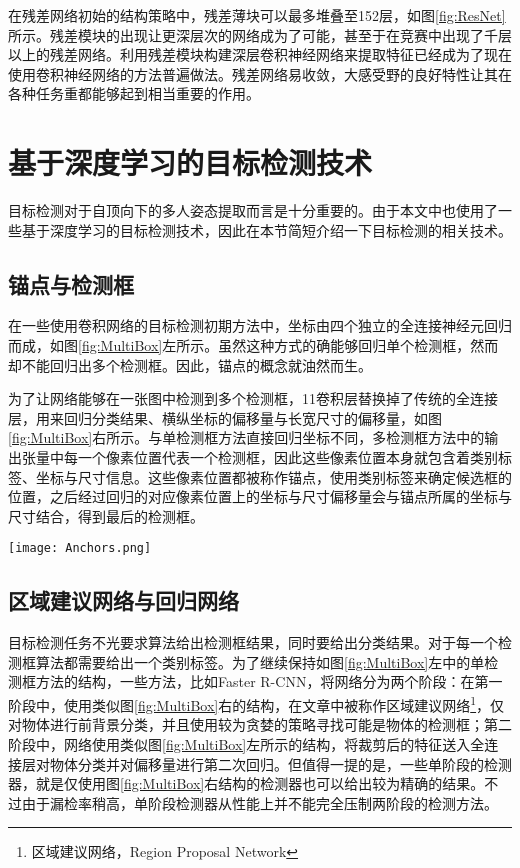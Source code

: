 在残差网络初始的结构策略中，残差薄块可以最多堆叠至152层，如图\ref{fig:ResNet}所示。残差模块的出现让更深层次的网络成为了可能，甚至于在竞赛中出现了千层以上的残差网络。利用残差模块构建深层卷积神经网络来提取特征已经成为了现在使用卷积神经网络的方法普遍做法。残差网络易收敛，大感受野的良好特性让其在各种任务重都能够起到相当重要的作用。

\section{基于深度学习的目标检测技术}
\label{sec:factsobjectdetection}
目标检测对于自顶向下的多人姿态提取而言是十分重要的。由于本文中也使用了一些基于深度学习的目标检测技术，因此在本节简短介绍一下目标检测的相关技术。

\subsection{锚点与检测框}
\label{subsec:factsanchors}
在一些使用卷积网络的目标检测初期方法中，坐标由四个独立的全连接神经元回归而成，如图\ref{fig:MultiBox}左所示。虽然这种方式的确能够回归单个检测框，然而却不能回归出多个检测框。因此，锚点的概念就油然而生。

为了让网络能够在一张图中检测到多个检测框，1\times1卷积层替换掉了传统的全连接层，用来回归分类结果、横纵坐标的偏移量与长宽尺寸的偏移量，如图\ref{fig:MultiBox}右所示。与单检测框方法直接回归坐标不同，多检测框方法中的输出张量中每一个像素位置代表一个检测框，因此这些像素位置本身就包含着类别标签、坐标与尺寸信息。这些像素位置都被称作锚点，使用类别标签来确定候选框的位置，之后经过回归的对应像素位置上的坐标与尺寸偏移量会与锚点所属的坐标与尺寸结合，得到最后的检测框。

\begin{figure*}[htbp]	
	\centering
	\texttt{[image: Anchors.png]}
	\caption{基于卷积神经网络的单检测框(左)与多检测框(右)方法}
	\label{fig:MultiBox}
\end{figure*}

\subsection{区域建议网络与回归网络}
\label{subsec:factsRPNregression}
目标检测任务不光要求算法给出检测框结果，同时要给出分类结果。对于每一个检测框算法都需要给出一个类别标签。为了继续保持如图\ref{fig:MultiBox}左中的单检测框方法的结构，一些方法，比如Faster R-CNN\cite{Ren2015Faster}，将网络分为两个阶段：在第一阶段中，使用类似图\ref{fig:MultiBox}右的结构，在文章中被称作区域建议网络\footnote{区域建议网络，Region Proposal Network}，仅对物体进行前背景分类，并且使用较为贪婪的策略寻找可能是物体的检测框；第二阶段中，网络使用类似图\ref{fig:MultiBox}左所示的结构，将裁剪后的特征送入全连接层对物体分类并对偏移量进行第二次回归。但值得一提的是，一些单阶段的检测器，就是仅使用图\ref{fig:MultiBox}右结构的检测器也可以给出较为精确的结果。不过由于漏检率稍高，单阶段检测器从性能上并不能完全压制两阶段的检测方法。

